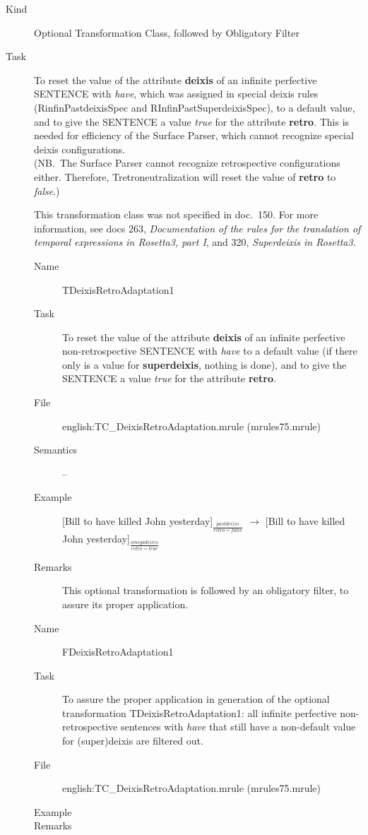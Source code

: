 \begin{description}
\item[Kind] Optional Transformation Class, followed by Obligatory Filter
\item[Task] To reset the value of the attribute {\bf deixis} of an infinite 
perfective SENTENCE with {\em have\/},
which was assigned in special deixis rules (RinfinPastdeixisSpec and 
RInfinPastSuperdeixisSpec),
to a default value, and to give the SENTENCE a value {\em true\/} for the 
attribute {\bf retro}. This is needed for efficiency of the Surface Parser, 
which cannot recognize special deixis configurations.\\
(NB.\ The Surface Parser cannot recognize retrospective configurations either. 
Therefore, Tretroneutralization will reset the value of {\bf retro} to {\em 
false}.)

This transformation class was 
not specified in doc.\ 150. For more information, see docs 263, {\em 
Documentation of the rules for the translation of temporal expressions in 
Rosetta3, part I\/}, and 320, {\em Superdeixis in Rosetta3\/}.

\vspace{1 cm}
\begin{description}
\item[Name] TDeixisRetroAdaptation1
\item[Task] To reset the value of the attribute {\bf deixis} of an infinite 
perfective non-retrospective SENTENCE with {\em have\/}
to a default value (if there only is a value for {\bf superdeixis}, nothing
is done), and to give the SENTENCE a value {\em true\/} for the 
attribute {\bf retro}. 
\item[File] english:TC\_DeixisRetroAdaptation.mrule (mrules75.mrule)
\item[Semantics] --
\item[Example] [Bill to have killed John yesterday]$_{\frac{pastdeixis}
{retro=false}}$ $\rightarrow$ [Bill to have killed John yesterday]$_{\frac
{omegadeixis}{retro=true}}$
\item[Remarks] This optional transformation is followed by an obligatory 
filter, to assure its proper application.
\end{description}

\vspace{1 cm}
\begin{description}
\item[Name] FDeixisRetroAdaptation1
\item[Task] To assure the proper application in generation of the optional 
transformation TDeixisRetroAdaptation1: all infinite perfective non-
retrospective sentences with {\em have\/} that still have a non-default value 
for (super)deixis are filtered out.
\item[File] english:TC\_DeixisRetroAdaptation.mrule (mrules75.mrule)
\item[Example] 
\item[Remarks]
\end{description}

\end{description}

